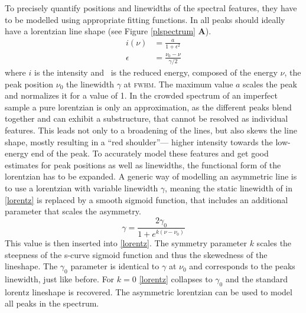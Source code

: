 To precisely quantify positions and linewidths of the spectral features, they have to be modelled using appropriate fitting functions. In \pl all peaks should ideally have a lorentzian line shape (see Figure \ref{plspectrum} \textbf{A}). 
\begin{align}
i(\nu)&= \frac{a}{1+\epsilon^2} \\
\epsilon &= \frac{\nu_0 - \nu}{\gamma /2}\label{lorentz}
\end{align}
where $i$ is the intensity and \epsilon\ is the reduced energy, composed of the energy $\nu$, the peak position $\nu_0$ the linewidth $\gamma$ at \textsc{fwhm}. The maximum value $a$ scales the peak and normalizes it for a value of 1. In the crowded spectrum of an imperfect sample a pure lorentzian is only an approximation, as the different peaks blend together and can exhibit a substructure, that cannot be resolved as individual features. This leads not only to a broadening of the lines, but also skews the line shape, mostly resulting in a ``red shoulder''--- higher intensity towards the low-energy end of the peak. To accurately model these features and get good estimates for peak positions as well as linewidths, the functional form of the lorentzian has to be expanded. A generic way of modelling an asymmetric line is to use a lorentzian with variable linewidth $\gamma$, meaning the static linewidth of in \ref{lorentz} is replaced by a smooth sigmoid function, that includes an additional parameter that scales the asymmetry\cite{stancik_simple_2008}.
\begin{equation} \gamma = \frac{2\gamma_0}{1+e^{k(\nu-\nu_0)}}\label{asymlorentz} \end{equation}
This value is then inserted into \eqref{lorentz}. The symmetry parameter $k$ scales the steepness of the s-curve sigmoid function and thus the skewedness of the lineshape. The $\gamma_0$ parameter is identical to $\gamma$ at $\nu_0$ and corresponds to the peaks linewidth, just like before. For $k=0$ \eqref{lorentz} collapses to $\gamma_0$ and the standard lorentz lineshape is recovered. The asymmetric lorentzian can be used to model all peaks in the \pl spectrum.

